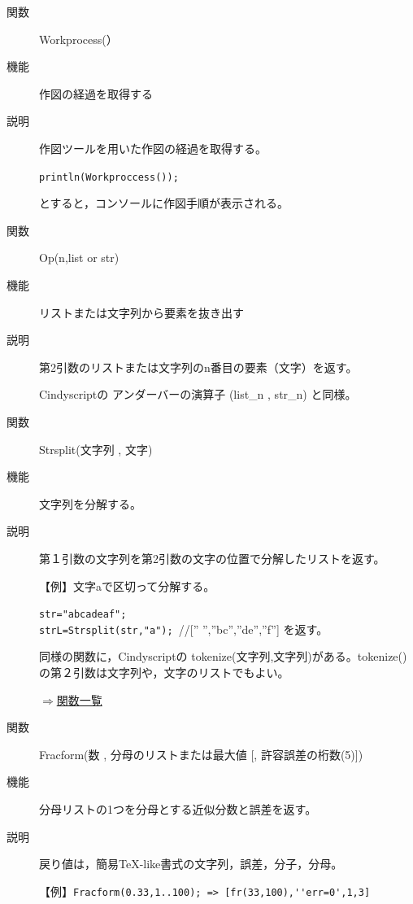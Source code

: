 \documentclass[papersize,a4paper,10pt,uplatex]{jsarticle}
\begin{document}
\begin{description}
\vspace{\baselineskip}
\hypertarget{workprocess}{}
\item[関数]Workprocess(）
\item[機能]作図の経過を取得する
\item[説明]作図ツールを用いた作図の経過を取得する。

\verb|println(Workproccess());|

とすると，コンソールに作図手順が表示される。

\vspace{\baselineskip}
\hypertarget{op}{}
\item[関数]Op(n,list or str)
\item[機能]リストまたは文字列から要素を抜き出す
\item[説明]第2引数のリストまたは文字列のn番目の要素（文字）を返す。

Cindyscriptの アンダーバーの演算子 (list\_n , str\_n) と同様。

\vspace{\baselineskip}
\hypertarget{strsplit}{}
\item[関数]Strsplit(文字列 , 文字)
\item[機能]文字列を分解する。
\item[説明]第１引数の文字列を第2引数の文字の位置で分解したリストを返す。

\vspace{\baselineskip}
【例】文字aで区切って分解する。

\verb|str="abcadeaf";| \\
\verb|strL=Strsplit(str,"a"); |//[” ”,”bc”,”de”,”f”] を返す。

同様の関数に，Cindyscriptの tokenize(文字列,文字列)がある。tokenize() の第２引数は文字列や，文字のリストでもよい。

\begin{flushright}\hyperlink{functionlist}{$\Rightarrow$関数一覧}\end{flushright}

\vspace{\baselineskip}
\hypertarget{fracform}{}
\item[関数]Fracform(数 , 分母のリストまたは最大値 [, 許容誤差の桁数(5)])
\item[機能]分母リストの1つを分母とする近似分数と誤差を返す。
\item[説明]戻り値は，簡易TeX-like書式の文字列，誤差，分子，分母。

\vspace{\baselineskip}
【例】\verb|Fracform(0.33,1..100); => [fr(33,100),''err=0',1,3]|


\end{description}
\end{document}
